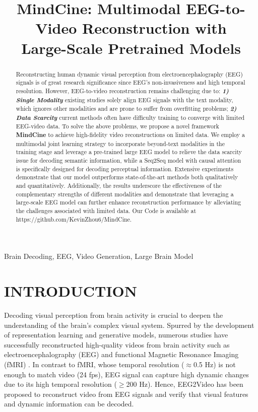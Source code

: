 \documentclass{article}
\title{MindCine: Multimodal EEG-to-Video Reconstruction with\\ Large-Scale Pretrained Models}
\begin{document}
\ninept %
%
\maketitle
%
\begin{abstract}
Reconstructing human dynamic visual perception from electroencephalography (EEG) signals is of great research significance since EEG’s non-invasiveness and high temporal resolution.
However, EEG-to-video reconstruction remains challenging due to: \textbf{\textit{1) Single Modality}} existing studies solely align EEG signals with the text modality, which ignores other modalities and are prone to suffer from overfitting problems; \textbf{\textit{2) Data Scarcity}} current methods often have difficulty training to converge with limited EEG-video data.
To solve the above problems, we propose a novel framework \textbf{MindCine} to achieve high-fidelity video reconstructions on limited data.
We employ a multimodal joint learning strategy to incorporate beyond-text modalities in the training stage and leverage a pre-trained large EEG model to relieve the data scarcity issue for decoding semantic information, while a Seq2Seq model with causal attention is specifically designed for decoding perceptual information.
Extensive experiments demonstrate that our model outperforms state-of-the-art methods both qualitatively and quantitatively.
Additionally, the results underscore the effectiveness of the complementary strengths of different modalities and demonstrate that leveraging a large-scale EEG model can further enhance reconstruction performance by alleviating the challenges associated with limited data. Our Code is available at https://github.com/KevinZhou6/MindCine.
\end{abstract}
%
\begin{keywords}
Brain Decoding, EEG, Video Generation, Large Brain Model
\end{keywords}
%
\section{INTRODUCTION}
\label{sec:intro}

Decoding visual perception from brain activity is crucial to deepen the understanding of the brain's complex visual system. Spurred by the development of representation learning and generative models, numerous studies have successfully reconstructed high-quality videos from brain activity such as electroencephalography (EEG) \cite{liu2024eeg2video,liu2025mindcross,huang2025mindev,liu2025eegmirror} and functional Magnetic Resonance Imaging (fMRI) \cite{chen2023cinematic, gong2024neuroclips, lu2024animate}. In contrast to fMRI, whose temporal resolution ($\approx$0.5 Hz) is not enough to match video (24 fps), EEG signal can capture high dynamic changes due to its high temporal resolution ($\geq$200 Hz).
Hence, EEG2Video \cite{liu2024eeg2video} has been proposed to reconstruct video from EEG signals and verify that visual features and dynamic information can be decoded.
\end{document}
